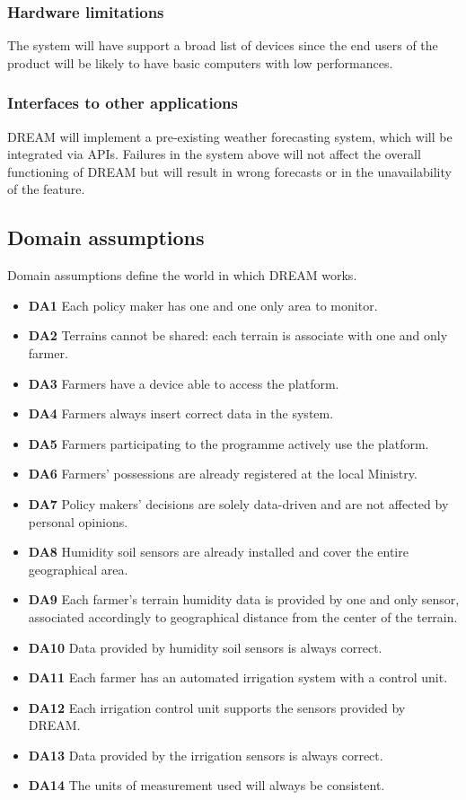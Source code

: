 \documentclass[10pt]{article}
\begin{document}
\subsubsection{Hardware limitations}
The system will have support a broad list of devices since the end users of the product will be likely
to have basic computers with low performances.
\subsubsection{Interfaces to other applications}
DREAM will implement a pre-existing weather forecasting system, which will be integrated via APIs. Failures in the 
system above will not affect the overall functioning of DREAM but will result in wrong forecasts or in the unavailability of the feature.
\subsection{Domain assumptions}
Domain assumptions define the world in which DREAM works. 
\begin{itemize}
    \item[] \textbf{DA1} Each policy maker has one and one only area to monitor.
    \item[] \textbf{DA2} Terrains cannot be shared: each terrain is associate with one and only farmer. 
    \item[] \textbf{DA3} Farmers have a device able to access the platform. 
    \item[] \textbf{DA4} Farmers always insert correct data in the system.
    \item[] \textbf{DA5} Farmers participating to the programme actively use the platform.
    \item[] \textbf{DA6} Farmers' possessions are already registered at the local Ministry.
    \item[] \textbf{DA7} Policy makers' decisions are solely data-driven and are not affected by personal opinions.
    \item[] \textbf{DA8} Humidity soil sensors are already installed and cover the entire geographical area.
    \item[] \textbf{DA9} Each farmer's terrain humidity data is provided by one and only sensor, associated accordingly to geographical distance from the center of the terrain.
    \item[] \textbf{DA10} Data provided by humidity soil sensors is always correct.
    \item[] \textbf{DA11} Each farmer has an automated irrigation system with a control unit.
    \item[] \textbf{DA12} Each irrigation control unit supports the sensors provided by DREAM.
    \item[] \textbf{DA13} Data provided by the irrigation sensors is always correct.
    \item[] \textbf{DA14} The units of measurement used will always be consistent. 
\end{itemize}
\newpage
\end{document}
